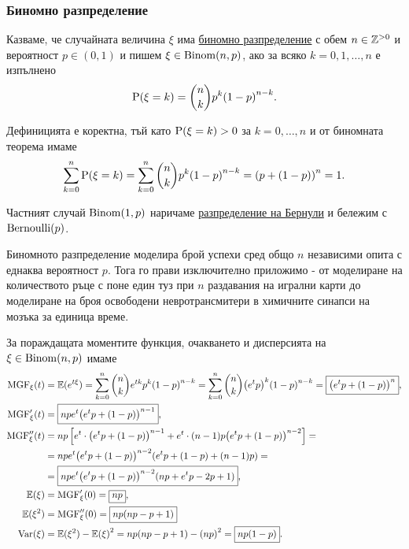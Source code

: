 \documentclass[numbers=endperiod, DIV=15, bibliography=totocnumbered]{scrartcl}
\begin{document}
\subsubsection{Биномно разпределение}\label{dist:geom}

\begin{definition}
  Казваме, че случайната величина $\xi$ има \uline{биномно разпределение} с обем $n \in \mathbb{Z}^{> 0}$ и вероятност $p \in (0, 1)$ и пишем $\xi \in \operatorname{Binom}(n, p)$, ако за всяко $k = 0, 1, \ldots, n$ е изпълнено
  \begin{displaymath}
    \operatorname{P}(\xi = k) = {n \choose k} p^k {(1-p)}^{n-k}.
  \end{displaymath}

  Дефиницията е коректна, тъй като $\operatorname{P}(\xi = k) > 0$ за $k = 0, \ldots, n$ и от биномната теорема имаме
  \begin{displaymath}
    \sum_{k=0}^n \operatorname{P}(\xi = k)
    =
    \sum_{k=0}^n {n \choose k} p^k {(1-p)}^{n-k}
    =
    {(p+(1-p))}^n = 1.
  \end{displaymath}

  Частният случай $\operatorname{Binom}(1, p)$ наричаме \uline{разпределение на Бернули} и бележим с $\operatorname{Bernoulli}(p)$.
\end{definition}

Биномното разпределение моделира брой успехи сред общо $n$ независими опита с еднаква вероятност $p$. Тога го прави изключително приложимо - от моделиране на количеството ръце с поне един туз при $n$ раздавания на игрални карти до моделиране на броя освободени невротрансмитери в химичните синапси на мозъка за единица време.

За пораждащата моментите функция, очакването и дисперсията на $\xi \in \operatorname{Binom}(n, p)$ имаме
\begingroup
\allowdisplaybreaks
\begin{align*}
  \operatorname{MGF}_\xi(t)
  &=
  \mathbb{E}(e^{t\xi})
  =
  \sum_{k=0}^n {n \choose k} e^{tk} p^k {(1-p)}^{n-k}
  =
  \sum_{k=0}^n {n \choose k} {\left( e^t p \right)}^k {(1-p)}^{n-k}
  =
  \boxed{{\left( e^t p + (1-p) \right)}^n},
  \\
  \operatorname{MGF}'_\xi(t)
  &=
  \boxed{n p e^t {\left( e^t p + (1-p) \right)}^{n-1}},
  \\
  \operatorname{MGF}''_\xi(t)
  &=
  n p \left[ e^t \cdot {\left( e^t p + (1-p) \right)}^{n-1} + e^t \cdot (n-1) p {\left( e^t p + (1-p) \right)}^{n-2} \right]
  = \\ &=
  n p e^t {\left( e^t p + (1-p) \right)}^{n-2} (e^t p + (1-p) + (n-1)p)
  = \\ &=
  \boxed{n p e^t {\left( e^t p + (1-p) \right)}^{n-2} (np + e^t p - 2p + 1)},
  \\
  \mathbb{E}(\xi)
  &=
  \operatorname{MGF}'_\xi(0)
  =
  \boxed{np},
  \\
  \mathbb{E}(\xi^2)
  &=
  \operatorname{MGF}''_\xi(0)
  =
  \boxed{np(np - p + 1)}
  \\
  \operatorname{Var}(\xi)
  &=
  \mathbb{E}(\xi^2) - {\mathbb{E}(\xi)}^2
  =
  np(np - p + 1) - {(np)}^2
  =
  \boxed{np(1 - p)}.
\end{align*}
\endgroup
\end{document}
